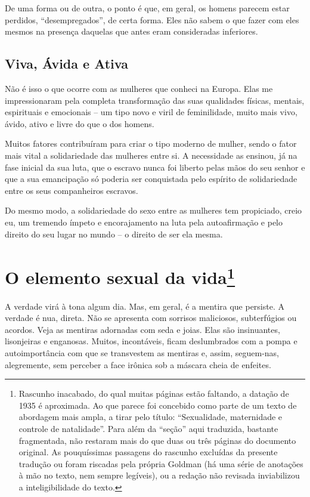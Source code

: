 De uma forma ou de outra, o ponto é que, em geral, os homens parecem
estar perdidos, ``desempregados'', de certa forma. Eles não sabem o que
fazer com eles mesmos na presença daquelas que antes eram consideradas
inferiores.

\section{Viva, Ávida e Ativa}

Não é isso o que ocorre com as mulheres que conheci na Europa. Elas me
impressionaram pela completa transformação das suas qualidades físicas,
mentais, espirituais e emocionais -- um tipo novo e viril de
feminilidade, muito mais vivo, ávido, ativo e livre do que o dos homens.

Muitos fatores contribuíram para criar o tipo moderno de mulher, sendo o
fator mais vital a solidariedade das mulheres entre si. A necessidade as
ensinou, já na fase inicial da sua luta, que o escravo nunca foi liberto
pelas mãos do seu senhor e que a sua emancipação só poderia ser
conquistada pelo espírito de solidariedade entre os seus companheiros
escravos.

Do mesmo modo, a solidariedade do sexo entre as mulheres tem propiciado,
creio eu, um tremendo ímpeto e encorajamento na luta pela autoafirmação
e pelo direito do seu lugar no mundo -- o direito de ser ela mesma.

\chapter[O elemento sexual da vida (1935)]{O elemento sexual da vida\footnote[*]{Rascunho inacabado, do qual muitas
  páginas estão faltando, a datação de 1935 é aproximada. Ao que parece foi
  concebido como parte de um texto de abordagem mais ampla, a tirar pelo
  título: ``Sexualidade, maternidade e controle de natalidade''. Para
  além da ``seção'' aqui traduzida, bastante fragmentada, não restaram
  mais do que duas ou três páginas do documento original. As
  pouquíssimas passagens do rascunho excluídas da presente tradução ou
  foram riscadas pela própria Goldman (há uma série de anotações à mão
  no texto, nem sempre legíveis), ou a redação não revisada inviabilizou
  a inteligibilidade do texto.}}



A verdade virá à tona algum dia. Mas, em geral, é a mentira que
persiste. A verdade é nua, direta. Não se apresenta com sorrisos
maliciosos, subterfúgios ou acordos. Veja as mentiras adornadas com seda
e joias. Elas são insinuantes, lisonjeiras e enganosas. Muitos,
incontáveis, ficam deslumbrados com a pompa e autoimportância com que se
transvestem as mentiras e, assim, seguem-nas, alegremente, sem perceber
a face irônica sob a máscara cheia de enfeites.

